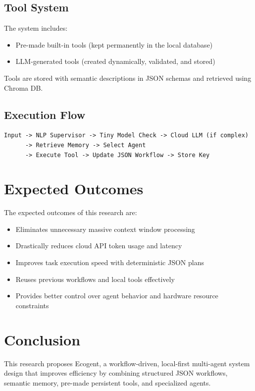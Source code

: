 \documentclass[12pt,a4paper]{article}
\begin{document}
\subsection{Tool System}
The system includes:
\begin{itemize}
    \item Pre-made built-in tools (kept permanently in the local database)
    \item LLM-generated tools (created dynamically, validated, and stored)
\end{itemize}
Tools are stored with semantic descriptions in JSON schemas and retrieved using Chroma DB.

\subsection{Execution Flow}
\begin{verbatim}
Input -> NLP Supervisor -> Tiny Model Check -> Cloud LLM (if complex)
      -> Retrieve Memory -> Select Agent
      -> Execute Tool -> Update JSON Workflow -> Store Key
\end{verbatim}

\section{Expected Outcomes}
The expected outcomes of this research are:
\begin{itemize}
    \item Eliminates unnecessary massive context window processing
    \item Drastically reduces cloud API token usage and latency
    \item Improves task execution speed with deterministic JSON plans
    \item Reuses previous workflows and local tools effectively
    \item Provides better control over agent behavior and hardware resource constraints
\end{itemize}

\section{Conclusion}
This research proposes Ecogent, a workflow-driven, local-first multi-agent system design that improves efficiency by combining structured JSON workflows, semantic memory, pre-made persistent tools, and specialized agents.

\medskip
\end{document}
